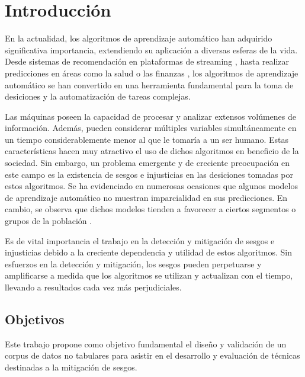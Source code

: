 \chapter*{Introducción}\label{chapter:introduction}

En la actualidad, los algoritmos de aprendizaje autom\'atico han adquirido significativa importancia, extendiendo su aplicaci\'on a diversas 
esferas de la vida. Desde sistemas de recomendaci\'on en plataformas de streaming \parencite{esmaeilzadeh2022abuse, bhattacharya2022augmenting}, hasta 
realizar predicciones en \'areas como la salud \parencite{roy2023machine} o las finanzas \parencite{sen2021machine}, los algoritmos de 
aprendizaje autom\'atico se han convertido en una herramienta fundamental para la toma de desiciones y la automatizaci\'on de tareas complejas.

Las m\'aquinas poseen la capacidad de procesar y analizar extensos vol\'umenes de informaci\'on. Adem\'as, pueden considerar m\'ultiples variables
simult\'aneamente en un tiempo considerablemente menor al que le tomar\'ia a un ser humano. Estas caracter\'isticas hacen muy atractivo el uso de
dichos algoritmos en beneficio de la sociedad. Sin embargo, un problema emergente y de creciente preocupaci\'on en este campo es la existencia de 
sesgos e injusticias en las desiciones tomadas por estos algoritmos. Se ha evidenciado en numerosas ocasiones que algunos modelos de aprendizaje 
autom\'atico no muestran imparcialidad en sus predicciones. En cambio, se observa que dichos modelos tienden a favorecer a ciertos segmentos 
o grupos de la poblaci\'on \parencite{survey}.
 
Es de vital importancia el trabajo en la detecci\'on y mitigaci\'on de sesgos e injusticias debido a la creciente dependencia y utilidad
de estos algoritmos. Sin esfuerzos en la detecci\'on y mitigaci\'on, los sesgos pueden perpetuarse y amplificarse a medida que los algoritmos se 
utilizan y actualizan con el tiempo, llevando a resultados cada vez m\'as perjudiciales. 



\section*{Objetivos}
Este trabajo propone como objetivo fundamental el dise\~no y validaci\'on de un corpus de datos no tabulares para
asistir en el desarrollo y evaluaci\'on de t\'ecnicas destinadas a la mitigaci\'on de sesgos.

